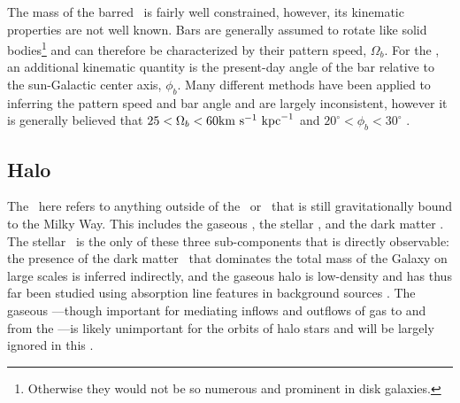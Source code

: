 The mass of the barred \mwbulge\ is fairly well constrained, however, its kinematic properties are not well known. Bars are generally assumed to rotate like solid bodies\footnote{Otherwise they would not be so numerous and prominent in disk galaxies.} and can therefore be characterized by their pattern speed, $\Omega_b$. For the \mwbulge, an additional kinematic quantity is the present-day angle of the bar relative to the sun-Galactic center axis, $\phi_b$. Many different methods have been applied to inferring the pattern speed and bar angle and are largely inconsistent, however it is generally believed that $25 < \Omega_b < 60 \mathrm{km}~\mathrm{s}^{-1}~\mathrm{kpc}^{-1}$ and $20^\circ < \phi_b < 30^\circ$ \citep{dwek95, stanek97, debattista02, shen10, wegg13, cao13, wegg15, portail15}.


\subsection{Halo} 

The \mwhalo\ here refers to anything outside of the \mwdisk\ or \mwbulge\ that is still gravitationally bound to the Milky Way. This includes the gaseous \mwhalo, the stellar \mwhalo, and the dark matter \mwhalo. The stellar \mwhalo\ is the only of these three sub-components that is directly observable: the presence of the dark matter \mwhalo\ that dominates the total mass of the Galaxy on large scales is inferred indirectly, and the gaseous halo is low-density and has thus far been studied using absorption line features in background sources \citep{miller13}. The gaseous \mwhalo---though important for mediating inflows and outflows of gas to and from the \mwdisk---is likely unimportant for the orbits of halo stars and will be largely ignored in this \article. %


